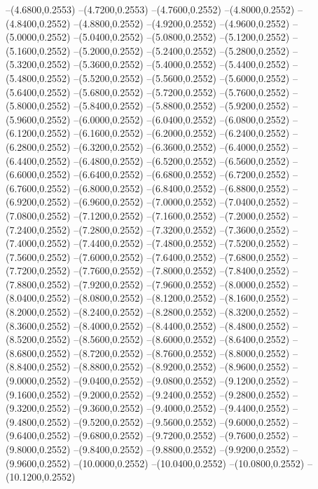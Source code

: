 {	--(4.6800,0.2553)
	--(4.7200,0.2553)
	--(4.7600,0.2552)
	--(4.8000,0.2552)
	--(4.8400,0.2552)
	--(4.8800,0.2552)
	--(4.9200,0.2552)
	--(4.9600,0.2552)
	--(5.0000,0.2552)
	--(5.0400,0.2552)
	--(5.0800,0.2552)
	--(5.1200,0.2552)
	--(5.1600,0.2552)
	--(5.2000,0.2552)
	--(5.2400,0.2552)
	--(5.2800,0.2552)
	--(5.3200,0.2552)
	--(5.3600,0.2552)
	--(5.4000,0.2552)
	--(5.4400,0.2552)
	--(5.4800,0.2552)
	--(5.5200,0.2552)
	--(5.5600,0.2552)
	--(5.6000,0.2552)
	--(5.6400,0.2552)
	--(5.6800,0.2552)
	--(5.7200,0.2552)
	--(5.7600,0.2552)
	--(5.8000,0.2552)
	--(5.8400,0.2552)
	--(5.8800,0.2552)
	--(5.9200,0.2552)
	--(5.9600,0.2552)
	--(6.0000,0.2552)
	--(6.0400,0.2552)
	--(6.0800,0.2552)
	--(6.1200,0.2552)
	--(6.1600,0.2552)
	--(6.2000,0.2552)
	--(6.2400,0.2552)
	--(6.2800,0.2552)
	--(6.3200,0.2552)
	--(6.3600,0.2552)
	--(6.4000,0.2552)
	--(6.4400,0.2552)
	--(6.4800,0.2552)
	--(6.5200,0.2552)
	--(6.5600,0.2552)
	--(6.6000,0.2552)
	--(6.6400,0.2552)
	--(6.6800,0.2552)
	--(6.7200,0.2552)
	--(6.7600,0.2552)
	--(6.8000,0.2552)
	--(6.8400,0.2552)
	--(6.8800,0.2552)
	--(6.9200,0.2552)
	--(6.9600,0.2552)
	--(7.0000,0.2552)
	--(7.0400,0.2552)
	--(7.0800,0.2552)
	--(7.1200,0.2552)
	--(7.1600,0.2552)
	--(7.2000,0.2552)
	--(7.2400,0.2552)
	--(7.2800,0.2552)
	--(7.3200,0.2552)
	--(7.3600,0.2552)
	--(7.4000,0.2552)
	--(7.4400,0.2552)
	--(7.4800,0.2552)
	--(7.5200,0.2552)
	--(7.5600,0.2552)
	--(7.6000,0.2552)
	--(7.6400,0.2552)
	--(7.6800,0.2552)
	--(7.7200,0.2552)
	--(7.7600,0.2552)
	--(7.8000,0.2552)
	--(7.8400,0.2552)
	--(7.8800,0.2552)
	--(7.9200,0.2552)
	--(7.9600,0.2552)
	--(8.0000,0.2552)
	--(8.0400,0.2552)
	--(8.0800,0.2552)
	--(8.1200,0.2552)
	--(8.1600,0.2552)
	--(8.2000,0.2552)
	--(8.2400,0.2552)
	--(8.2800,0.2552)
	--(8.3200,0.2552)
	--(8.3600,0.2552)
	--(8.4000,0.2552)
	--(8.4400,0.2552)
	--(8.4800,0.2552)
	--(8.5200,0.2552)
	--(8.5600,0.2552)
	--(8.6000,0.2552)
	--(8.6400,0.2552)
	--(8.6800,0.2552)
	--(8.7200,0.2552)
	--(8.7600,0.2552)
	--(8.8000,0.2552)
	--(8.8400,0.2552)
	--(8.8800,0.2552)
	--(8.9200,0.2552)
	--(8.9600,0.2552)
	--(9.0000,0.2552)
	--(9.0400,0.2552)
	--(9.0800,0.2552)
	--(9.1200,0.2552)
	--(9.1600,0.2552)
	--(9.2000,0.2552)
	--(9.2400,0.2552)
	--(9.2800,0.2552)
	--(9.3200,0.2552)
	--(9.3600,0.2552)
	--(9.4000,0.2552)
	--(9.4400,0.2552)
	--(9.4800,0.2552)
	--(9.5200,0.2552)
	--(9.5600,0.2552)
	--(9.6000,0.2552)
	--(9.6400,0.2552)
	--(9.6800,0.2552)
	--(9.7200,0.2552)
	--(9.7600,0.2552)
	--(9.8000,0.2552)
	--(9.8400,0.2552)
	--(9.8800,0.2552)
	--(9.9200,0.2552)
	--(9.9600,0.2552)
	--(10.0000,0.2552)
	--(10.0400,0.2552)
	--(10.0800,0.2552)
	--(10.1200,0.2552)
}

